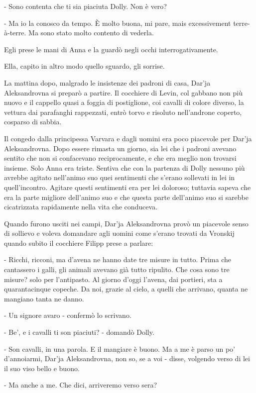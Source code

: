 - Sono contenta che ti sia piaciuta Dolly. Non è vero? 

- Ma io la conosco da tempo. È molto buona, mi pare, mais excessivement terre-à-terre. Ma sono stato molto contento di vederla. 

Egli prese le mani di Anna e la guardò negli occhi interrogativamente. 

Ella, capito in altro modo quello sguardo, gli sorrise. 

La mattina dopo, malgrado le insistenze dei padroni di casa, Dar'ja Aleksandrovna si preparò a partire. Il cocchiere di Levin, col gabbano non più nuovo e il cappello quasi a foggia di postiglione, coi cavalli di colore diverso, la vettura dai parafanghi rappezzati, entrò torvo e risoluto nell'androne coperto, cosparso di sabbia. 

Il congedo dalla principessa Varvara e dagli uomini era poco piacevole per Dar'ja Aleksandrovna. Dopo essere rimasta un giorno, sia lei che i padroni avevano sentito che non si confacevano reciprocamente, e che era meglio non trovarsi insieme. Solo Anna era triste. Sentiva che con la partenza di Dolly nessuno più avrebbe agitato nell'animo suo quei sentimenti che s'erano sollevati in lei in quell'incontro. Agitare questi sentimenti era per lei doloroso; tuttavia sapeva che era la parte migliore dell'animo suo e che questa parte dell'animo suo si sarebbe cicatrizzata rapidamente nella vita che conduceva. 

Quando furono usciti nei campi, Dar'ja Aleksandrovna provò un piacevole senso di sollievo e voleva domandare agli uomini come s'erano trovati da Vronskij quando subito il cocchiere Filipp prese a parlare: 

- Ricchi, ricconi, ma d'avena ne hanno date tre misure in tutto. Prima che cantassero i galli, gli animali avevano già tutto ripulito. Che cosa sono tre misure? solo per l'antipasto. Al giorno d'oggi l'avena, dai portieri, sta a quarantacinque copeche. Da noi, grazie al cielo, a quelli che arrivano, quanta ne mangiano tanta ne danno. 

- Un signore avaro - confermò lo scrivano. 

- Be', e i cavalli ti son piaciuti? - domandò Dolly. 

- Son cavalli, in una parola. E il mangiare è buono. Ma a me è parso un po' d'annoiarmi, Dar'ja Aleksandrovna, non so, se a voi - disse, volgendo verso di lei il suo viso bello e buono. 

- Ma anche a me. Che dici, arriveremo verso sera? 

